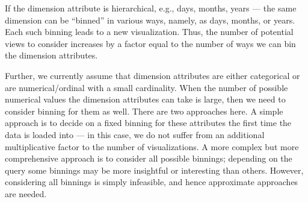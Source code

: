
 
 
 
If the dimension attribute is hierarchical, e.g., days, months, years ---
 the same dimension can be ``binned'' in various ways, namely, 
 as days, months, or years. 
 Each such binning leads to a new visualization.
Thus, the number of potential views to consider increases 
by a factor equal to the number of ways we can bin the dimension attributes.

 Further, we currently assume that dimension attributes are either categorical or are
 numerical/ordinal with a small cardinality.
 When the number of possible numerical values the dimension attributes
 can take is large, then we need to consider binning for them as well.
 There are two approaches here. 
  A simple approach is to decide on a fixed binning for these attributes the
 first time the data is loaded into \SeeDB --- in this case, 
 we do not suffer from an additional multiplicative factor to the number of
 visualizations.
 A more complex but more comprehensive approach is to consider all possible binnings;
 depending on the query some binnings may be more insightful or interesting than others. However, considering all binnings is simply infeasible, and hence
 approximate approaches are needed.

